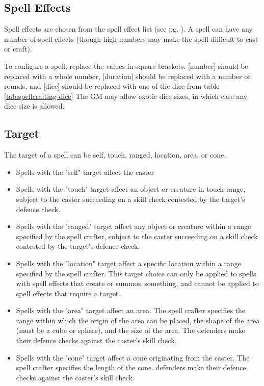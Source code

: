 \begin{multicols*}{2}
    \subsection{Spell Effects}
    Spell effects are chosen from the spell effect list (see pg.
    \pageref{spell-effect-list}). A spell can have any number of spell effects
    (though high numbers may make the spell difficult to cast or craft).

    To configure a spell, replace the values in square brackets. [number] should
    be replaced with a whole number, [duration] should be replaced with a number
    of rounds, and [dice] should be replaced with one of the dice from table
    \ref{tab:spellcrafting-dice}
    The GM may allow exotic dice sizes, in which case any dice size is allowed.

    \subsection{Target}
    The target of a spell can be self, touch, ranged, location, area, or cone.
    \begin{itemize}
        \item Spells with the "self" target affect the caster
        \item Spells with the "touch" target affect an object or creature in
            touch range, subject to the caster succeeding on a skill check
            contested by the target's defence check.
        \item Spells with the "ranged" target affect any object or creature
            within a range specified by the spell crafter, subject to the caster
            succeeding on a skill check contested by the target's defence check.
        \item Spells with the "location" target affect a specific location
            within a range specified by the spell crafter.
            This target choice can only be applied to spells with spell effects
            that create or summon something, and cannot be applied to spell
            effects that require a target.
        \item Spells with the "area" target affect an area. The spell crafter
            specifies the range within which the origin of the area can be
            placed, the shape of the area (must be a cube or sphere), and the
            size of the area. The defenders make their defence checks against
            the caster's skill check.
        \item Spells with the "cone" target affect a cone originating from
            the caster. The spell crafter specifies the length of the cone.
            defenders make their defence checks against the caster's skill
            check.
    \end{itemize}


\end{multicols*}
